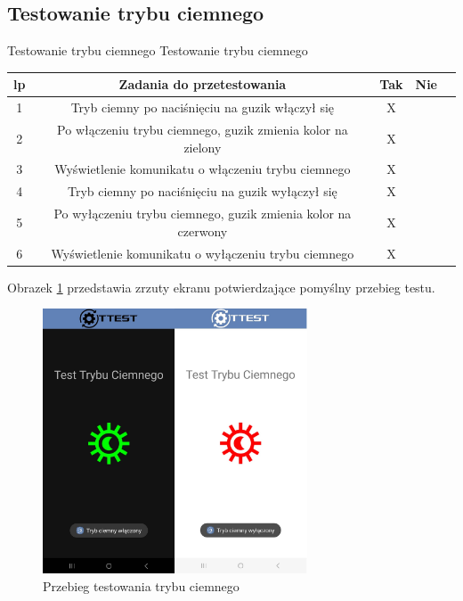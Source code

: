 \newpage


\subsection{Testowanie trybu ciemnego}

\begin{tabela}
	{Testowanie trybu ciemnego}	%
	{Testowanie trybu ciemnego}	%
	{
		\begin{tabular}{|c|c|c|c|c|} \hline
			\textbf{lp} & \textbf{Zadania do przetestowania} & \textbf{Tak} & \textbf{Nie} \\ \hline
			1 & Tryb ciemny po naciśnięciu na guzik włączył się & X & ~ \\ \hline
			2 & Po włączeniu trybu ciemnego, guzik zmienia kolor na zielony & X & ~ \\ \hline
			3 & Wyświetlenie komunikatu o włączeniu trybu ciemnego & X & ~ \\ \hline
			4 & Tryb ciemny po naciśnięciu na guzik wyłączył się & X & ~ \\ \hline
			5 & Po wyłączeniu trybu ciemnego, guzik zmienia kolor na czerwony & X & ~ \\ \hline
			6 & Wyświetlenie komunikatu o wyłączeniu trybu ciemnego & X & ~ \\ \hline
	\end{tabular}	}
	\label{tab:tablica_ciemny}
\end{tabela}

Obrazek \ref{rys:ciemny} przedstawia zrzuty ekranu potwierdzające pomyślny przebieg testu.

\begin{figure}[!hbt]
	\begin{center}
		\includegraphics[angle=360, width=0.70\textwidth]{rys/punkt5/ciemny.jpg}
		\caption{Przebieg testowania trybu ciemnego}
		\label{rys:ciemny}
	\end{center}
\end{figure}   

